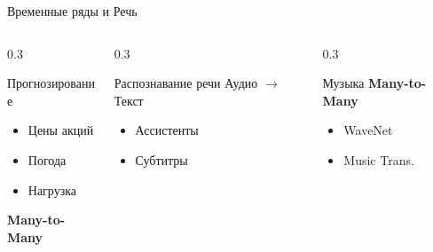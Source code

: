 \documentclass[aspectratio=169, 10pt]{beamer}
\begin{document}
\begin{frame}{Временные ряды и Речь}
  \begin{columns}[T]
    \begin{column}{0.3\textwidth}
      \begin{block}{Прогнозирование}
        \scriptsize
        \begin{itemize}
          \item Цены акций
          \item Погода
          \item Нагрузка
        \end{itemize}
        \textbf{Many-to-Many}
      \end{block}
    \end{column}
    
    \begin{column}{0.3\textwidth}
      \begin{block}{Распознавание речи}
        \scriptsize
        Аудио $\to$ Текст
        \begin{itemize}
          \item Ассистенты
          \item Субтитры
        \end{itemize}
      \end{block}
    \end{column}
    
    \begin{column}{0.3\textwidth}
      \begin{block}{Музыка}
        \scriptsize
        \textbf{Many-to-Many}
        \begin{itemize}
          \item WaveNet
          \item Music Trans.
        \end{itemize}
      \end{block}
    \end{column}
  \end{columns}
\end{frame}
\end{document}
